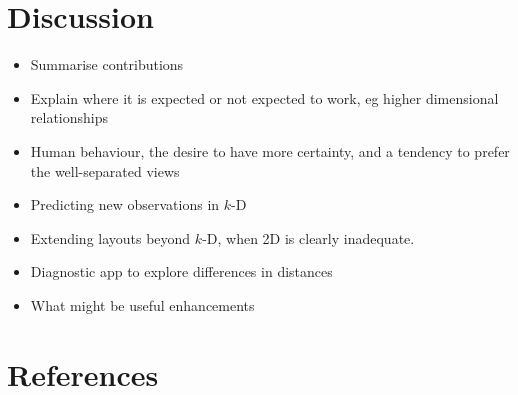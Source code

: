 \documentclass[
  12pt]{article}
\providecommand{\tightlist}{%
  \setlength{\itemsep}{0pt}\setlength{\parskip}{0pt}}\usepackage{longtable,booktabs,array}
\def\tightlist{}
\begin{document}
\section{Discussion}\label{sec-discussion}

\begin{itemize}
\tightlist
\item
  Summarise contributions
\item
  Explain where it is expected or not expected to work, eg higher
  dimensional relationships
\item
  Human behaviour, the desire to have more certainty, and a tendency to
  prefer the well-separated views
\item
  Predicting new observations in \(k\)-D
\item
  Extending layouts beyond \(k\)-D, when 2D is clearly inadequate.
\item
  Diagnostic app to explore differences in distances
\item
  What might be useful enhancements
\end{itemize}

\section*{References}\label{references}

\renewcommand{\bibsection}{}


\newpage{}
\end{document}
